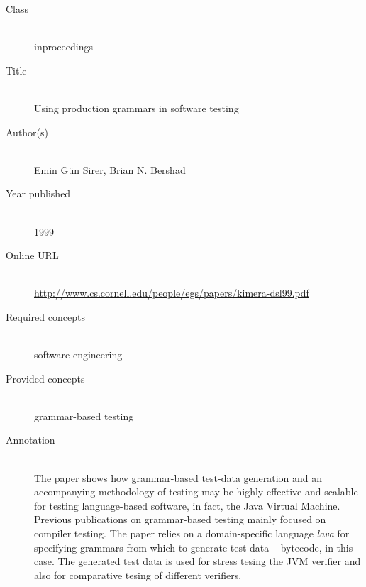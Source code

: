 \begin{description}
\item[Class]\mbox{}\\
inproceedings
\item[Title]\mbox{}\\
Using production grammars in software testing
\item[Author(s)]\mbox{}\\
Emin G{\"u}n Sirer, Brian N. Bershad\item[Year published]\mbox{}\\
1999
\item[Online URL]\mbox{}\\
{\footnotesize\url{http://www.cs.cornell.edu/people/egs/papers/kimera-dsl99.pdf}}
\item[Required concepts]\mbox{}\\
software engineering\item[Provided concepts]\mbox{}\\
grammar-based testing\item[Annotation]\mbox{}\\
The paper shows how grammar-based test-data generation and an accompanying methodology of testing may be highly effective and scalable for testing language-based software, in fact, the Java Virtual Machine. Previous publications on grammar-based testing mainly focused on compiler testing. The paper relies on a domain-specific language \emph{lava} for specifying grammars from which to generate test data -- bytecode, in this case. The generated test data is used for stress tesing the JVM verifier and also for comparative tesing of different verifiers.
\end{description}

